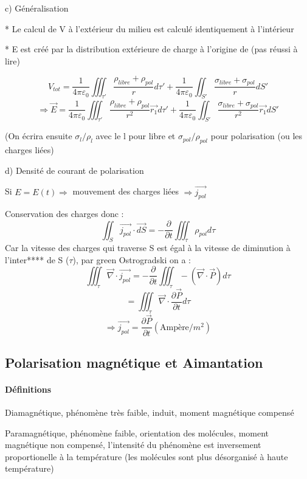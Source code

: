 \documentclass[12pt,a4paper]{report}
\begin{document}
c) Généralisation

* Le calcul de V à l'extérieur du milieu est calculé identiquement à l'intérieur

* E est créé par la distribution extérieure de charge à l'origine de (pas réussi à lire)

\[
	V_{tot} = \dfrac{1}{4\pi \varepsilon_0} \iiint_{\tau'} \dfrac{\rho_{libre} + \rho_{pol}}{r} d\tau' + \dfrac{1}{4\pi \varepsilon_0} \iint_{S'} \dfrac{\sigma_{libre} + \sigma_{pol}}{r} dS'
\]
\[
	\Rightarrow \vec{E} = \dfrac{1}{4\pi \varepsilon_0} \iiint_{\tau'} \dfrac{\rho_{libre} + \rho_{pol}}{r^2}\vec{r_1} d\tau' + \dfrac{1}{4\pi \varepsilon_0} \iint_{S'} \dfrac{\sigma_{libre} + \sigma_{pol}}{r^2} \vec{r_1} dS'
\]

(On écrira ensuite \(\sigma_l / \rho_l\) avec le l pour libre et \(\sigma_{pol} / \rho_{pol}\) pour polarisation (ou les charges liées)

d) Densité de courant de polarisation

Si \(E = E(t) \Rightarrow\) mouvement des charges liées \(\Rightarrow \vec{j_{pol}}\)

Conservation des charges donc :
\[
	\iint_S \vec{j_{pol}} \cdot \vec{dS} = - \dfrac{\partial}{\partial t} \iiint_\tau \rho_{pol} d\tau
\]
Car la vitesse des charges qui traverse S est égal à la vitesse de diminution à l'inter**** de S (\(\tau\)), par green Ostrogradski on a :
\[
	\iiint_\tau \vec{\nabla} \cdot \vec{j_{pol}} = - \dfrac{\partial}{\partial t} \iiint_\tau - (\vec{\nabla} \cdot \vec{P}) d\tau
\]
\[
	= \iiint_{\tau} \vec{\nabla} \cdot \dfrac{\partial \vec{P}}{\partial t} d\tau
\]
\[
	\Rightarrow \vec{j_{pol}} = \dfrac{\partial \vec{P}}{\partial t} (\text{Ampère}/m^2)
\]

\subsection{Polarisation magnétique et Aimantation}

\paragraph{Définitions}\quad \par

Diamagnétique, phénomène très faible, induit, moment magnétique compensé

Paramagnétique, phénomène faible, orientation des molécules, moment magnétique non compensé, l'intensité du phénomène est inversement proportionelle à la température (les molécules sont plus désorganisé à haute température)
\end{document}
